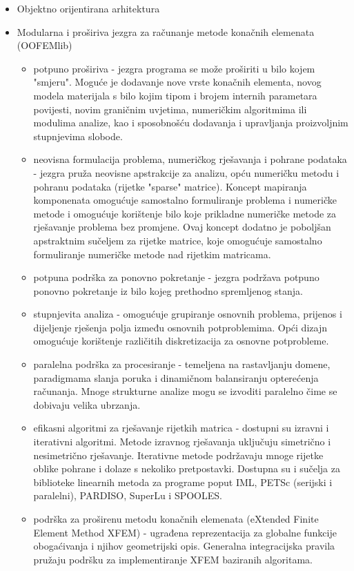 \documentclass[a4paper,twoside,12pt]{memoir} %
\begin{document}
\begin{itemize}
    \item Objektno orijentirana arhitektura
    \item Modularna i proširiva jezgra za računanje metode konačnih elemenata (OOFEMlib)
    \begin{itemize}
        \item potpuno proširiva - jezgra programa se može proširiti u bilo kojem "smjeru". Moguće je dodavanje nove vrste konačnih elementa, novog modela materijala s bilo kojim tipom i brojem internih parametara povijesti, novim graničnim uvjetima, numeričkim algoritmima ili modulima analize, kao i sposobnošću dodavanja i upravljanja proizvoljnim stupnjevima slobode.
        \item neovisna formulacija problema, numeričkog rješavanja i pohrane podataka - jezgra pruža neovisne apstrakcije za analizu, opću numeričku metodu i pohranu podataka (rijetke "sparse" matrice). Koncept mapiranja komponenata omogućuje samostalno formuliranje problema i numeričke metode i omogućuje korištenje bilo koje prikladne numeričke metode za rješavanje problema bez promjene. Ovaj koncept dodatno je poboljšan apstraktnim sučeljem za rijetke matrice, koje omogućuje samostalno formuliranje numeričke metode nad rijetkim matricama.
        \item potpuna podrška za ponovno pokretanje - jezgra podržava potpuno ponovno pokretanje iz bilo kojeg prethodno spremljenog stanja.
        \item stupnjevita analiza - omogućuje grupiranje osnovnih problema, prijenos i dijeljenje rješenja polja između osnovnih potproblemima. Opći dizajn omogućuje korištenje različitih diskretizacija za osnovne potprobleme.
        \item paralelna podrška za procesiranje - temeljena na rastavljanju domene, paradigmama slanja poruka i dinamičnom balansiranju opterećenja računanja. Mnoge strukturne analize mogu se izvoditi paralelno čime se dobivaju velika ubrzanja.
        \item efikasni algoritmi za rješavanje rijetkih matrica - dostupni su izravni i iterativni algoritmi. Metode izravnog rješavanja uključuju simetrično i nesimetrično rješavanje. Iterativne metode podržavaju mnoge rijetke oblike pohrane i dolaze s nekoliko pretpostavki. Dostupna su i sučelja za biblioteke linearnih metoda za programe poput IML, PETSc (serijski i paralelni), PARDISO, SuperLu i SPOOLES.
        \item podrška za proširenu metodu konačnih elemenata (eXtended Finite Element Method XFEM) - ugrađena reprezentacija za globalne funkcije obogaćivanja i njihov geometrijski opis. Generalna integracijska pravila pružaju podršku za implementiranje XFEM baziranih algoritama.

\end{itemize}
\end{itemize}
\end{document}
